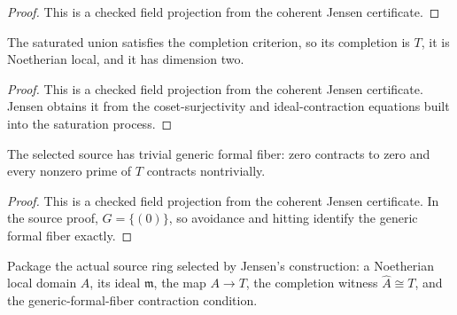 \begin{proof}
  This is a checked field projection from the coherent Jensen certificate.
\end{proof}

\begin{lemma}
  \label{lem:jensen_completion_output_source}
  The saturated union satisfies the completion criterion, so its completion is
  \(T\), it is Noetherian local, and it has dimension two.
\end{lemma}

\begin{proof}
  This is a checked field projection from the coherent Jensen certificate.
  Jensen obtains it from the coset-surjectivity and ideal-contraction
  equations built into the saturation process.
\end{proof}

\begin{lemma}
  \label{lem:jensen_generic_formal_fiber_output_source}
  The selected source has trivial generic formal fiber: zero contracts to zero
  and every nonzero prime of \(T\) contracts nontrivially.
\end{lemma}

\begin{proof}
  This is a checked field projection from the coherent Jensen certificate.
  In the source proof, \(G=\{(0)\}\), so avoidance and hitting identify the
  generic formal fiber exactly.
\end{proof}

\begin{definition}
  \label{def:jensen_selected_source}
  Package the actual source ring selected by Jensen's construction: a
  Noetherian local domain \(A\), its ideal \(\mathfrak m\), the map
  \(A\to T\), the completion witness \(\widehat A\cong T\), and the
  generic-formal-fiber contraction condition.
\end{definition}


